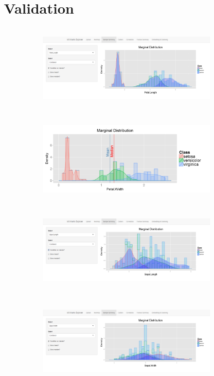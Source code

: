\documentclass[12pt]{article}
\begin{document}
\section{Validation}
\label{sec:val}

\begin{figure}
	\centering
	\begin{subfigure}[b]{0.8\textwidth}
		\includegraphics[width=\textwidth, height = 1.75in]{Figures/Iris/MarginalPetalLength.png}
		\subcaption{}
	\end{subfigure}	
	\begin{subfigure}[b]{0.8\textwidth}
		\includegraphics[width=\textwidth, height = 1.75in]{Figures/Iris/MarginalPetalWidth.png}
		\subcaption{}
	\end{subfigure}
	\begin{subfigure}[b]{0.8\textwidth}
		\includegraphics[width=\textwidth, height = 1.75in]{Figures/Iris/MarginalSepalLength.png}
		\subcaption{}
	\end{subfigure}
	\begin{subfigure}[b]{0.8\textwidth}
		\includegraphics[width=\textwidth, height = 1.75in]{Figures/Iris/MarginalSepalWidth.png}

\end{subfigure}
\end{figure}
\end{document}
